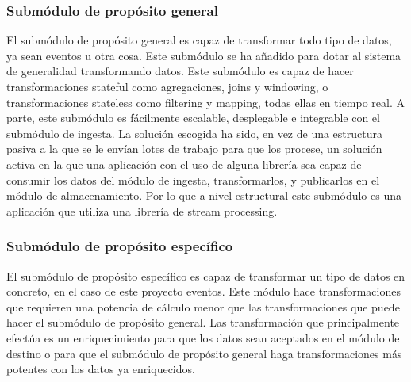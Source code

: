 \subsubsection{Submódulo de propósito general}
El submódulo de propósito general es capaz de transformar todo tipo de datos, ya sean eventos u otra cosa. Este submódulo se ha añadido para dotar al sistema de generalidad transformando datos. Este submódulo es capaz de hacer transformaciones stateful como agregaciones, joins y windowing, o transformaciones stateless como filtering y mapping, todas ellas en tiempo real. A parte, este submódulo es fácilmente escalable, desplegable e integrable con el submódulo de ingesta. La solución escogida ha sido, en vez de una estructura pasiva a la que se le envían lotes de trabajo para que los procese, un solución activa en la que una aplicación con el uso de alguna librería sea capaz de consumir los datos del módulo de ingesta, transformarlos, y publicarlos en el módulo de almacenamiento. Por lo que a nivel estructural este submódulo es una aplicación que utiliza una librería de stream processing.

\subsubsection{Submódulo de propósito específico}
El submódulo de propósito específico es capaz de transformar un tipo de datos en concreto, en el caso de este proyecto eventos. Este módulo hace transformaciones que requieren una potencia de cálculo menor que las transformaciones que puede hacer el submódulo de propósito general. Las transformación que principalmente efectúa es un enriquecimiento para que los datos sean aceptados en el módulo de destino o para que el submódulo de propósito general haga transformaciones más potentes con los datos ya enriquecidos. \\\\


